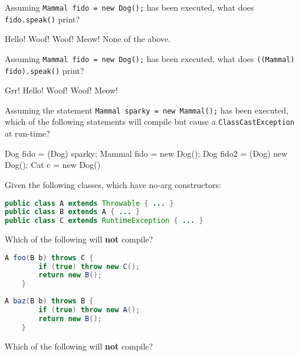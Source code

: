 \documentclass[addpoints,9pt]{exam}
\begin{document}
\begin{questions}
\question[3] Assuming {\tt Mammal fido = new Dog();} has been executed, what does {\tt fido.speak()} print?
\begin{choices}
\choice  Hello!
\choice  Woof! Woof!
\choice  Meow!
\correctchoice None of the above.
\end{choices}

\question[3] Assuming {\tt Mammal fido = new Dog();} has been executed, what does {\tt ((Mammal) fido).speak()} print?
\vspace{-.05in}
\begin{choices}
\correctchoice Grr!
\choice  Hello!
\choice  Woof! Woof!
\choice  Meow!
\end{choices}

\question[3] Assuming the statement {\tt Mammal sparky = new Mammal();} has been executed, which of the following statements will compile but cause a {\tt ClassCastException} at run-time?
\begin{choices}
\correctchoice  Dog fido = (Dog) sparky;
\choice Mammal fido = new Dog();
\choice Dog fido2 = (Dog) new Dog();
\choice Cat c = new Dog()
\end{choices}




\newpage

Given the following classes, which have no-arg constructors:

\begin{lstlisting}[language=Java]
public class A extends Throwable { ... }
public class B extends A { ... }
public class C extends RuntimeException { ... }
\end{lstlisting}

\question[3] Which of the following will {\bf not} compile?

\begin{choices}
\choice
\begin{lstlisting}[language=Java]
    A foo(B b) throws C {
        if (true) throw new C();
        return new B();
    }
\end{lstlisting}

\correctchoice
\begin{lstlisting}[language=Java]
    A baz(B b) throws B {
        if (true) throw new A();
        return new B();
    }
\end{lstlisting}

\end{choices}

\question[3] Which of the following will {\bf not} compile?


\end{questions}
\end{document}
